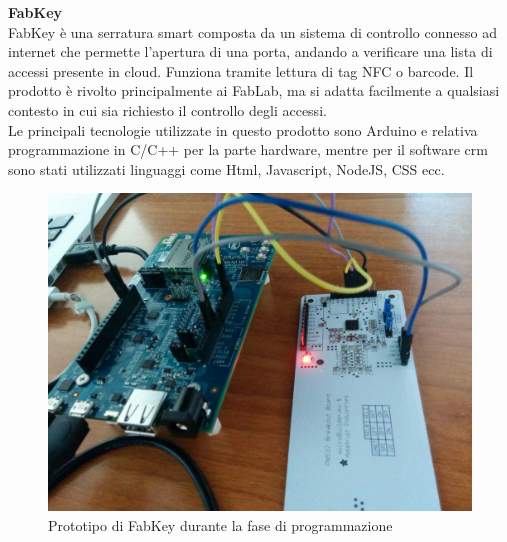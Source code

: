 \noindent \textbf{FabKey}
\\
FabKey è una serratura smart composta da un sistema di controllo connesso ad internet che permette l'apertura di una porta, andando a verificare una lista di accessi presente in cloud. Funziona tramite lettura di tag \gls{NFC} o barcode. Il prodotto è rivolto principalmente ai \gls{FabLab}, ma si adatta facilmente a qualsiasi contesto in cui sia richiesto il controllo degli accessi.\\
Le principali tecnologie utilizzate in questo prodotto sono Arduino e relativa programmazione in C/C++ per la parte hardware, mentre per il software crm sono stati utilizzati linguaggi come Html, Javascript, NodeJS, CSS ecc.
\\
\begin{figure}[H]
	\begin{center}
	\includegraphics[scale=0.2]{immagini/fabkey.jpg}
	\caption{Prototipo di FabKey durante la fase di programmazione}
	\end{center}
\end{figure}

